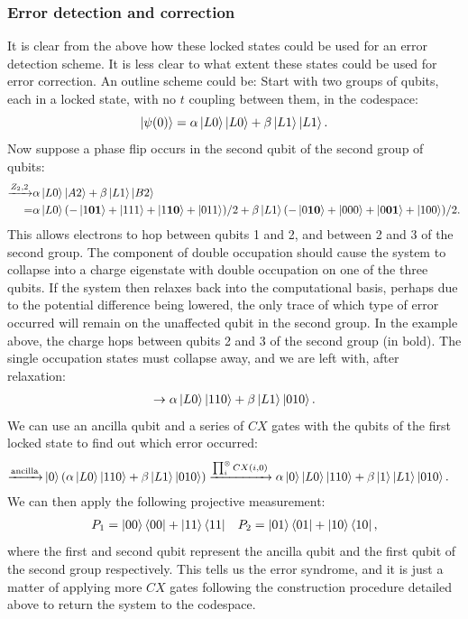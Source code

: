 \documentclass{report}
\begin{document}
\begin{appendices}
\subsubsection{Error detection and correction}
It is clear from the above how these locked states could be used for an error detection scheme. It is less clear to what extent these states could be used for error correction. An outline scheme could be:
Start with two groups of qubits, each in a locked state, with no $t$ coupling between them, in the codespace:
\begin{equation*}
    \ket{\psi(0)} = \alpha\ket{L0}\ket{L0} + \beta\ket{L1}\ket{L1}.
\end{equation*} Now suppose a phase flip occurs in the second qubit of the second group of qubits:
\begin{align*}
    \xrightarrow{Z_2,2} &\alpha\ket{L0}\ket{A2} + \beta\ket{L1}\ket{B2}\\
    =&\alpha\ket{L0}(-\ket{1\mathbf{01}} + \ket{111} + \ket{1\mathbf{10}}+\ket{011})/2 + \beta\ket{L1}(-\ket{0\mathbf{10}} + \ket{000} + \ket{0\mathbf{01}}+\ket{100})/2.
\end{align*}
This allows electrons to hop between qubits 1 and 2, and between 2 and 3 of the second group. The component of double occupation should cause the system to collapse into a charge eigenstate with double occupation on one of the three qubits. If the system then relaxes back into the computational basis, perhaps due to the potential difference being lowered, the only trace of which type of error occurred will remain on the unaffected qubit in the second group. In the example above, the charge hops between qubits 2 and 3 of the second group (in bold). The single occupation states must collapse away, and we are left with, after relaxation:
\begin{align*}
    \rightarrow\alpha\ket{L0}\ket{110} + \beta\ket{L1}\ket{010}.
\end{align*}We can use an ancilla qubit and a series of $CX$ gates with the qubits of the first locked state to find out which error occurred:
\begin{align*}
    \xrightarrow{\text{ancilla}} & \ket{0}(\alpha\ket{L0}\ket{110} + \beta\ket{L1}\ket{010})
    \xrightarrow{\prod_i^\otimes CX(i,0)}\alpha\ket{0}\ket{L0}\ket{110} + \beta\ket{1}\ket{L1}\ket{010}.
\end{align*} We can then apply the following projective measurement:
\begin{align*}
    P_1 = \ket{00}\bra{00} + \ket{11}\bra{11} && P_2 = \ket{01}\bra{01} + \ket{10}\bra{10},
\end{align*}
where the first and second qubit represent the ancilla qubit and the first qubit of the second group respectively. This tells us the error syndrome, and it is just a matter of applying more $CX$ gates following the construction procedure detailed above to return the system to the codespace.


\end{appendices}
\end{document}
